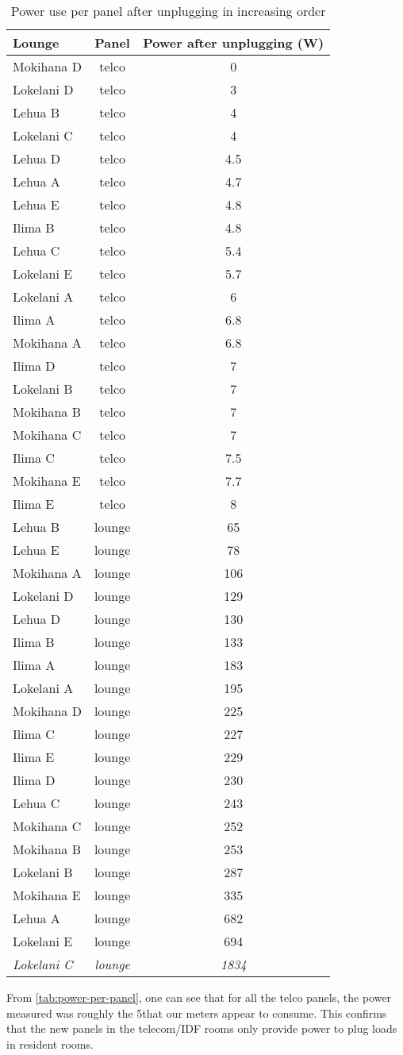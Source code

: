\begin{table}[htbp]
	\centering
	\scriptsize
		\begin{tabular}{| l | c | c |}
			\hline
			Lounge & Panel & Power after unplugging (W) \tabularnewline \hline \hline
			Mokihana D & telco & 0 \tabularnewline \hline
			Lokelani D & telco & 3 \tabularnewline \hline
			Lehua B & telco & 4 \tabularnewline \hline
			Lokelani C & telco & 4 \tabularnewline \hline
			Lehua D & telco & 4.5 \tabularnewline \hline
			Lehua A & telco & 4.7 \tabularnewline \hline
			Lehua E & telco & 4.8 \tabularnewline \hline
			Ilima B & telco & 4.8 \tabularnewline \hline
			Lehua C & telco & 5.4 \tabularnewline \hline
			Lokelani E & telco & 5.7 \tabularnewline \hline
			Lokelani A & telco & 6 \tabularnewline \hline
			Ilima A & telco & 6.8 \tabularnewline \hline
			Mokihana A & telco & 6.8 \tabularnewline \hline
			Ilima D & telco & 7 \tabularnewline \hline
			Lokelani B & telco & 7 \tabularnewline \hline
			Mokihana B & telco & 7 \tabularnewline \hline
			Mokihana C & telco & 7 \tabularnewline \hline
			Ilima C & telco & 7.5 \tabularnewline \hline
			Mokihana E & telco &7.7 \tabularnewline \hline
			Ilima E & telco & 8 \tabularnewline \hline \hline
			Lehua B & lounge & 65 \tabularnewline \hline
			Lehua E & lounge & 78 \tabularnewline \hline
			Mokihana A & lounge & 106 \tabularnewline \hline
			Lokelani D & lounge & 129 \tabularnewline \hline
			Lehua D & lounge & 130 \tabularnewline \hline
			Ilima B & lounge & 133 \tabularnewline \hline \hline
			Ilima A & lounge & 183 \tabularnewline \hline
			Lokelani A & lounge & 195 \tabularnewline \hline
			Mokihana D & lounge & 225 \tabularnewline \hline
			Ilima C & lounge & 227 \tabularnewline \hline
			Ilima E & lounge & 229 \tabularnewline \hline
			Ilima D & lounge & 230 \tabularnewline \hline
			Lehua C & lounge & 243 \tabularnewline \hline
			Mokihana C & lounge & 252 \tabularnewline \hline
			Mokihana B & lounge & 253 \tabularnewline \hline
			Lokelani B & lounge & 287 \tabularnewline \hline
			Mokihana E & lounge & 335 \tabularnewline \hline
			Lehua A & lounge & 682 \tabularnewline \hline
			Lokelani E & lounge & 694 \tabularnewline \hline \hline
			\emph{Lokelani C} & \emph{lounge} & \emph{1834} \tabularnewline \hline
		\end{tabular}
	\caption{Power use per panel after unplugging in increasing order}
\label{tab:power-per-panel}
\end{table}

From \autoref{tab:power-per-panel}, one can see that for all the telco panels, the power measured was roughly the 5\W that our meters appear to consume. This confirms that the new panels in the telecom/IDF rooms only provide power to plug loads in resident rooms.

